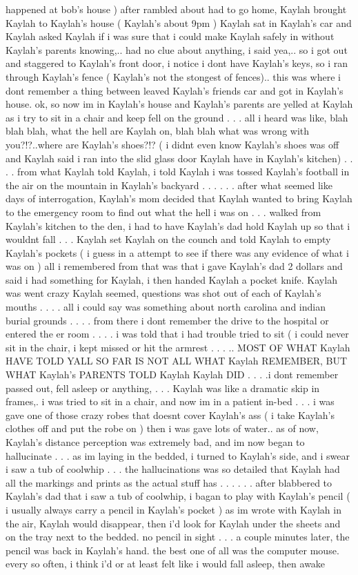 \documentclass[12pt]{book}
\begin{document}
happened at bob's house ) after rambled about had to go home, Kaylah brought Kaylah to Kaylah's house ( Kaylah's about 9pm ) Kaylah sat in Kaylah's car and Kaylah asked Kaylah if i was sure that i could make Kaylah safely in without Kaylah's parents knowing,.. had no clue about anything, i said yea,.. so i got out and staggered to Kaylah's front door, i notice i dont have Kaylah's keys, so i ran through Kaylah's fence ( Kaylah's not the stongest of fences).. this was where i dont remember a thing between leaved Kaylah's friends car and got in Kaylah's house. ok, so now im in Kaylah's house and Kaylah's parents are yelled at Kaylah as i try to sit in a chair and keep fell on the ground . . .  all i heard was like, blah blah blah, what the hell are Kaylah on, blah blah what was wrong with you?!?..where are Kaylah's shoes?!? ( i didnt even know Kaylah's shoes was off and Kaylah said i ran into the slid glass door Kaylah have in Kaylah's kitchen) . . .  . from what Kaylah told Kaylah, i told Kaylah i was tossed Kaylah's football in the air on the mountain in Kaylah's backyard . . .   . . .  after what seemed like days of interrogation, Kaylah's mom decided that Kaylah wanted to bring Kaylah to the emergency room to find out what the hell i was on . . .  walked from Kaylah's kitchen to the den, i had to have Kaylah's dad hold Kaylah up so that i wouldnt fall . . .  Kaylah set Kaylah on the counch and told Kaylah to empty Kaylah's pockets ( i guess in a attempt to see if there was any evidence of what i was on ) all i remembered from that was that i gave Kaylah's dad 2 dollars and said i had something for Kaylah, i then handed Kaylah a pocket knife. Kaylah was went crazy Kaylah seemed, questions was shot out of each of Kaylah's mouths . . .  . all i could say was something about north carolina and indian burial grounds . . .  . from there i dont remember the drive to the hospital or entered the er room . . .  . i was told that i had trouble tried to sit ( i could never sit in the chair, i kept missed or hit the armrest . . . .. MOST OF WHAT Kaylah HAVE TOLD YALL SO FAR IS NOT ALL WHAT Kaylah REMEMBER, BUT WHAT Kaylah's PARENTS TOLD Kaylah Kaylah DID . . .  .i dont remember passed out, fell asleep or anything, . . .  Kaylah was like a dramatic skip in frames,. i was tried to sit in a chair, and now im in a patient in-bed . . .  i was gave one of those crazy robes that doesnt cover Kaylah's ass ( i take Kaylah's clothes off and put the robe on ) then i was gave lots of water.. as of now, Kaylah's distance perception was extremely bad, and im now began to hallucinate . . .  as im laying in the bedded, i turned to Kaylah's side, and i swear i saw a tub of coolwhip . . .  the hallucinations was so detailed that Kaylah had all the markings and prints as the actual stuff has . . .   . . .  after blabbered to Kaylah's dad that i saw a tub of coolwhip, i bagan to play with Kaylah's pencil ( i usually always carry a pencil in Kaylah's pocket ) as im wrote with Kaylah in the air, Kaylah would disappear, then i'd look for Kaylah under the sheets and on the tray next to the bedded. no pencil in sight . . .  a couple minutes later, the pencil was back in Kaylah's hand. the best one of all was the computer mouse. every so often, i think i'd or at least felt like i would fall asleep, then awake 
\end{document}
